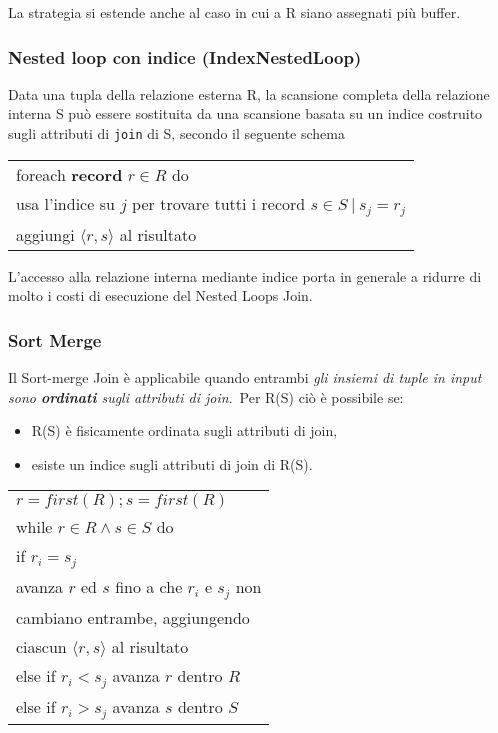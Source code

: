 \noindent La strategia si estende anche al caso in cui a R siano assegnati più buffer.\

\subsubsection{Nested loop con indice (IndexNestedLoop)}

Data una tupla della relazione esterna R, la scansione completa della relazione interna S può essere sostituita da una scansione basata su un indice costruito sugli attributi di \texttt{join} di S, secondo il seguente schema

\begin{table}[H]
	\centering
	\begin{tabular}{|l|}
		\hline
		foreach \textbf{record} $r \in R$ do                                        \\
		\quad usa l'indice su $j$ per trovare tutti i record $s \in S\ |\ s_j =r_j$ \\
		\quad aggiungi $\langle r,s\rangle$ al risultato                            \\\hline
	\end{tabular}
\end{table}

\noindent L'accesso alla relazione interna mediante indice porta in generale a ridurre di molto i costi di esecuzione del Nested Loops Join.

\subsubsection{Sort Merge}

Il Sort-merge Join è applicabile quando entrambi \textit{gli insiemi di tuple in input sono \textbf{ordinati} sugli attributi di join}.\
Per R(S) ciò è possibile se:
\begin{itemize}
	\item R(S) è fisicamente ordinata sugli attributi di join,
	\item esiste un indice sugli attributi di join di R(S).
\end{itemize}

\begin{table}[H]
	\centering
	\begin{tabular}{|l|}
		\hline
		$r=\mathit{first}(R); s =\mathit{first}(R)$           \\
		while $r\in R \land s \in S$ do                       \\
		\quad if $r_i =s_j$                                   \\
		\qquad avanza $r$ ed $s$ fino a che $r_i$ e $s_j$ non \\
		\qquad cambiano entrambe, aggiungendo                 \\
		\qquad ciascun $\langle r,s\rangle$ al risultato      \\
		\quad else if $r_i <s_j$ avanza $r$ dentro $R$        \\
		\quad else if $r_i > s_j$ avanza $s$ dentro $S$       \\\hline
	\end{tabular}
\end{table}

